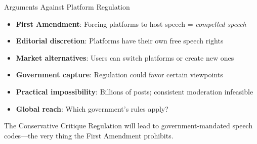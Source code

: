 ﻿\documentclass[aspectratio=169,11pt]{beamer}
\begin{document}
\begin{frame}{Arguments Against Platform Regulation}
\begin{itemize}
    \item \textbf{First Amendment}: Forcing platforms to host speech = \textit{compelled speech}
    
    \item \textbf{Editorial discretion}: Platforms have their own free speech rights
    
    \item \textbf{Market alternatives}: Users can switch platforms or create new ones
    
    \item \textbf{Government capture}: Regulation could favor certain viewpoints
    
    \item \textbf{Practical impossibility}: Billions of posts; consistent moderation infeasible
    
    \item \textbf{Global reach}: Which government's rules apply?
\end{itemize}

\vspace{0.3cm}
\begin{alertblock}{The Conservative Critique}
Regulation will lead to government-mandated speech codes---the very thing the First Amendment prohibits.
\end{alertblock}
\end{frame}
\end{document}
